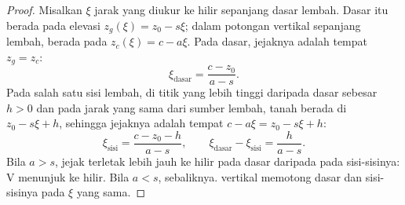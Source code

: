 \begin{proof}
Misalkan $\xi$ jarak yang diukur ke hilir sepanjang dasar lembah. Dasar itu berada pada elevasi $z_g(\xi) = z_0 - s\xi$; dalam potongan vertikal sepanjang lembah,  berada pada $z_c(\xi) = c - a\xi$. Pada dasar, jejaknya adalah tempat $z_g = z_c$:
\[
  \xi_{\text{dasar}} = \frac{c - z_0}{a - s}.
\]
Pada salah satu sisi lembah, di titik yang lebih tinggi daripada dasar sebesar $h > 0$ dan pada jarak yang sama dari sumber lembah, tanah berada di $z_0 - s\xi + h$, sehingga jejaknya adalah tempat $c - a\xi = z_0 - s\xi + h$:
\[
  \xi_{\text{sisi}} = \frac{c - z_0 - h}{a - s}, \qquad
  \xi_{\text{dasar}} - \xi_{\text{sisi}} = \frac{h}{a - s}.
\]
Bila $a > s$, jejak terletak lebih jauh ke hilir pada dasar daripada pada sisi-sisinya: V menunjuk ke hilir. Bila $a < s$, sebaliknya.  vertikal memotong dasar dan sisi-sisinya pada $\xi$ yang sama.
\end{proof}

